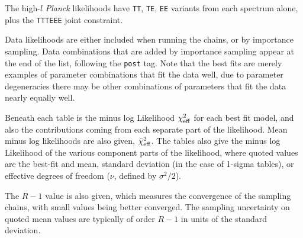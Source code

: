 \vskip 1cm
The high-$l$ \textit{Planck} likelihoods have {\tt TT}, {\tt TE}, {\tt EE} variants from each spectrum alone, plus the {\tt TTTEEE} joint constraint.

Data likelihoods are either included when running the chains, or by importance sampling. Data combinations that are added by importance sampling appear
at the end of the list, following the {\tt post{\textunderscore}} tag. Note that the best fits are merely examples of parameter combinations that fit the data well, due to parameter degeneracies there may be other combinations of parameters that fit the data nearly equally well.

Beneath each table is the minus log Likelihood $\chi^2_{\rm eff}$ for each best fit model, and also the contributions coming from each separate part of the likelihood. Mean minus log likelihoods are also given, $\bar{\chi}^2_{\rm eff}$.
The tables also give the minus log Likelihood of the various component parts of the likelihood, where quoted values are the best-fit and mean, standard deviation (in the case of 1-sigma tables), or effective degrees of freedom ($\nu$, defined by $\sigma^2/2$).

The $R-1$ value is also given, which measures the convergence of the sampling chains, with small values being better converged. The sampling uncertainty on quoted mean values are typically of order $R-1$ in units of the standard deviation.


\newpage
